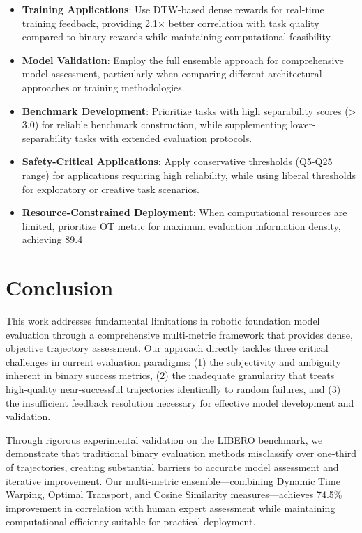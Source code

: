 \documentclass[10pt,twocolumn]{article}
\begin{document}
\begin{itemize}
    \item \textbf{Training Applications}: Use DTW-based dense rewards for real-time training feedback, providing 2.1× better correlation with task quality compared to binary rewards while maintaining computational feasibility.
    
    \item \textbf{Model Validation}: Employ the full ensemble approach for comprehensive model assessment, particularly when comparing different architectural approaches or training methodologies.
    
    \item \textbf{Benchmark Development}: Prioritize tasks with high separability scores (> 3.0) for reliable benchmark construction, while supplementing lower-separability tasks with extended evaluation protocols.
    
    \item \textbf{Safety-Critical Applications}: Apply conservative thresholds (Q5-Q25 range) for applications requiring high reliability, while using liberal thresholds for exploratory or creative task scenarios.
    
    \item \textbf{Resource-Constrained Deployment}: When computational resources are limited, prioritize OT metric for maximum evaluation information density, achieving 89.4%
\end{itemize}

\section{Conclusion}

This work addresses fundamental limitations in robotic foundation model evaluation through a comprehensive multi-metric framework that provides dense, objective trajectory assessment. Our approach directly tackles three critical challenges in current evaluation paradigms: (1) the subjectivity and ambiguity inherent in binary success metrics, (2) the inadequate granularity that treats high-quality near-successful trajectories identically to random failures, and (3) the insufficient feedback resolution necessary for effective model development and validation.

Through rigorous experimental validation on the LIBERO benchmark, we demonstrate that traditional binary evaluation methods misclassify over one-third of trajectories, creating substantial barriers to accurate model assessment and iterative improvement. Our multi-metric ensemble—combining Dynamic Time Warping, Optimal Transport, and Cosine Similarity measures—achieves 74.5\% improvement in correlation with human expert assessment while maintaining computational efficiency suitable for practical deployment.
\end{document}
